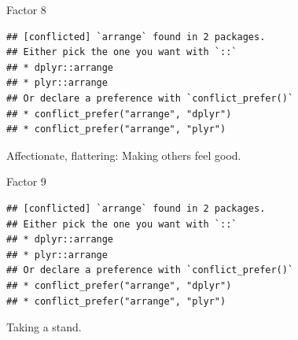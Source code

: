 \documentclass[ignorenonframetext,]{beamer}
\newenvironment{Shaded}{\begin{snugshade}}{\end{snugshade}}
\newcommand{\DecValTok}[1]{\textcolor[rgb]{0.00,0.00,0.81}{#1}}
\newcommand{\KeywordTok}[1]{\textcolor[rgb]{0.13,0.29,0.53}{\textbf{#1}}}
\newcommand{\NormalTok}[1]{#1}
\newcommand{\OperatorTok}[1]{\textcolor[rgb]{0.81,0.36,0.00}{\textbf{#1}}}
\newcommand{\StringTok}[1]{\textcolor[rgb]{0.31,0.60,0.02}{#1}}
\begin{document}
\begin{frame}[fragile]{Factor 8}
\protect\hypertarget{factor-8}{}

\begin{Shaded}
\end{Shaded}

\begin{verbatim}
## [conflicted] `arrange` found in 2 packages.
## Either pick the one you want with `::` 
## * dplyr::arrange
## * plyr::arrange
## Or declare a preference with `conflict_prefer()`
## * conflict_prefer("arrange", "dplyr")
## * conflict_prefer("arrange", "plyr")
\end{verbatim}

Affectionate, flattering: Making others feel good.

\end{frame}

\begin{frame}[fragile]{Factor 9}
\protect\hypertarget{factor-9}{}

\begin{Shaded}
\end{Shaded}

\begin{verbatim}
## [conflicted] `arrange` found in 2 packages.
## Either pick the one you want with `::` 
## * dplyr::arrange
## * plyr::arrange
## Or declare a preference with `conflict_prefer()`
## * conflict_prefer("arrange", "dplyr")
## * conflict_prefer("arrange", "plyr")
\end{verbatim}

Taking a stand.

\end{frame}
\end{document}
